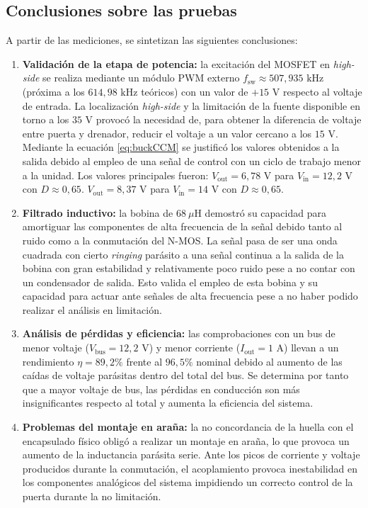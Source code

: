 \documentclass[12pt]{report} %
\begin{document}
\subsection{Conclusiones sobre las pruebas}
\label{subsec:conclusiones_lab}
A partir de las mediciones, se sintetizan las siguientes conclusiones:
\begin{enumerate}
    \item \textbf{Validación de la etapa de potencia:} la excitación del MOSFET en \textit{high-side} se realiza mediante un módulo PWM externo $f_{\text{sw}} \approx 507{,}935\text{ kHz}$ (próxima a los $614{,}98\text{ kHz}$ teóricos) con un valor de $+15$ V respecto al voltaje de entrada. La localización \textit{high-side} y la limitación de la fuente disponible en torno a los $35$ V provocó la necesidad de, para obtener la diferencia de voltaje entre puerta y drenador, reducir el voltaje a un valor cercano a los $15$ V. 
    Mediante la ecuación \ref{eq:buckCCM} se justificó los valores obtenidos a la salida debido al empleo de una señal de control con un ciclo de trabajo menor a la unidad. Los  valores principales fueron:
    \subitem $V_{\text{out}} = 6{,}78\text{ V}$ para $V_{\text{in}} = 12{,}2\text{ V}$ con $D \approx 0{,}65$.
    \subitem $V_{\text{out}} = 8{,}37\text{ V}$ para $V_{\text{in}} = 14\text{ V}$ con $D \approx 0{,}65$.
    \item \textbf{Filtrado inductivo:} la bobina de $68~\mu\text{H}$ demostró su capacidad para amortiguar las componentes de alta frecuencia de la señal debido tanto al ruido como a la conmutación del N-MOS. La señal pasa de ser una onda cuadrada con cierto \textit{ringing} parásito a una señal continua a la salida de la bobina con gran estabilidad y relativamente poco ruido pese a no contar con un condensador de salida. Esto valida el empleo de esta bobina y su capacidad para actuar ante señales de alta frecuencia pese a no haber podido realizar el análisis en limitación. 
    \item \textbf{Análisis de pérdidas y eficiencia:} las comprobaciones con un bus de menor voltaje ($V_{\text{bus}} = 12{,}2\text{ V}$) y menor corriente ($I_{\text{out}} = 1\text{ A}$) llevan a un rendimiento $\eta = 89{,}2\%$ frente al $96{,}5\%$ nominal debido al aumento de las caídas de voltaje parásitas dentro del total del bus. Se determina por tanto que a mayor voltaje de bus, las pérdidas en conducción son más insignificantes respecto al total y aumenta la eficiencia del sistema.
    \item \textbf{Problemas del montaje en araña:} la no concordancia de la huella con el encapsulado físico obligó a realizar un montaje en araña, lo que provoca un aumento de la inductancia parásita serie. Ante los picos de corriente y voltaje producidos durante la conmutación, el acoplamiento provoca inestabilidad en los componentes analógicos del sistema impidiendo un correcto control de la puerta durante la no limitación. 
\end{enumerate}
\end{document}
